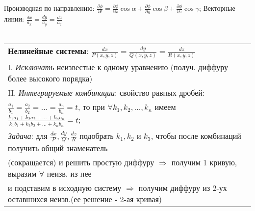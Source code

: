 \vspace{1ex}
Производная по направлению: $\displaystyle\frac{\partial\phi}{\partial{l}} = \frac{\partial\phi}{\partial{x}}\cos{\alpha} + \frac{\partial\phi}{\partial{y}}\cos{\beta} + \frac{\partial\phi}{\partial{z}}\cos{\gamma}$;
Векторные линии: 
$\displaystyle \frac{dx}{a_x} = \frac{dy}{a_y} = \frac{dz}{a_z}$
\\\\
\begin{tabular}{|l|}
	\hline
	\textbf{Нелинейные системы}: $\displaystyle\frac{dx}{P(x,y,z)} = \frac{dy}{Q(x,y,z)} = \frac{dz}{R(x,y,z)}$ \\
	I. \textit{Исключать} неизвестые к одному уравнению (получ. диффуру более высокого порядка) \\
	II. \textit{Интегрируемые комбинации}: свойство равных дробей: \\ 
	$\displaystyle \frac{a_1}{b_1} = \frac{a_2}{b_2} = ... = \frac{a_n}{b_n} = t$, то при $\forall k_1, k_2,...,k_n$ имеем
	$\displaystyle \frac{k_1a_1 + k_2a_2+...+k_na_n}{k_1b_1 + k_2b_2 +...+k_nb_n} = t$; \\ 
	\textit{Задача}: для $\displaystyle \frac{dx}{P},\frac{dy}{Q},\frac{dz}{R}$ подобрать $k_1,k_2$ и $k_3$, чтобы после комбинаций получить общий знаменатель \\
	(сокращается) и решить простую диффуру $\Rightarrow$ получим 1 кривую, выразим $\forall$ неизв. из нее \\ 
	и подставим в исходную систему $\Rightarrow$ получим диффуру из 2-ух оставшихся неизв.(ее решение - 2-ая кривая) \\
	\hline
\end{tabular}

